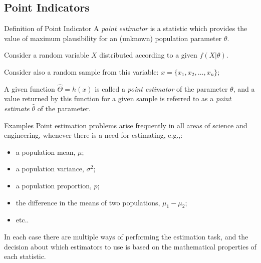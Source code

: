 \subsection{Point Indicators}
\begin{frame}{Definition of Point Indicator}
  A \emph{point estimator} is a statistic which provides the value of maximum plausibility for an (unknown) population parameter $\theta$.
  \bigskip

  Consider a random variable $X$ distributed according to a given $f(X|\theta)$.\bigskip

  Consider also a random sample from this variable: $x=\{x_1,x_2,\ldots,x_n\}$;\bigskip

  A given function $\hat{\Theta}=h\left(x\right)$ is called a \emph{point estimator} of the parameter $\theta$, and a value returned by this function for a given sample is referred to as a \emph{point estimate} $\hat{\theta}$ of the parameter.
\end{frame}

\begin{frame}{Examples}
Point estimation problems arise frequently in all areas of science and engineering, whenever there is a need for estimating, e.g.,:\bigskip

\begin{itemize}
  \item a population  mean, $\mu$;
	\item a population variance, $\sigma^2$;
	\item a population proportion, $p$;
	\item the difference in the means of two populations, $\mu_1-\mu_2$;
	\item etc..
\end{itemize}\bigskip

In each case there are multiple ways of performing the estimation task, and the decision about which estimators to use is based on the mathematical properties of each statistic.
\end{frame}

